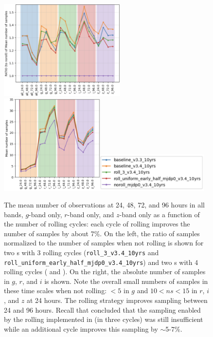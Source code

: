 \begin{figure}
    \centering

    \includegraphics[height=50mm]{figures/rolling_sampling.png}\includegraphics[height=50.5mm]{figures/rolling_nsamples.png}\includegraphics[height=20mm]{figures/rolling_nsamples_legend.png}
    \caption{The mean number of observations at 24, 48, 72, and 96 hours in all bands, $g$-band only, $r$-band only, and $z$-band only as a function of the number of rolling cycles: each cycle of rolling improves the number of samples by about 7\%. On the left, the ratio of samples normalized to the number of samples when not rolling is shown for two \opsim s with 3 rolling cycles (\texttt{roll\_3\_v3.4\_10yrs} and \texttt{roll\_uniform\_early\_half\_mjdp0\_v3.4\_10yrs}) and two \opsim s with 4 rolling cycles ( and ). On the right, the absolute number of samples in $g$, $r$, and $i$ is shown. Note the overall small numbers of samples in these time scales when not rolling: $<5$ in $g$ and  $10<ns< 15$ in $r$, $i$, and $z$ at 24 hours. The rolling strategy improves sampling between 24 and 96 hours. Recall that  concluded that the sampling enabled by the rolling implemented in  (in three cycles) was still insufficient while an additional cycle improves this sampling by $\sim$5-7\%. %
    }
    \label{fig:rolling_sampling}
\end{figure}

